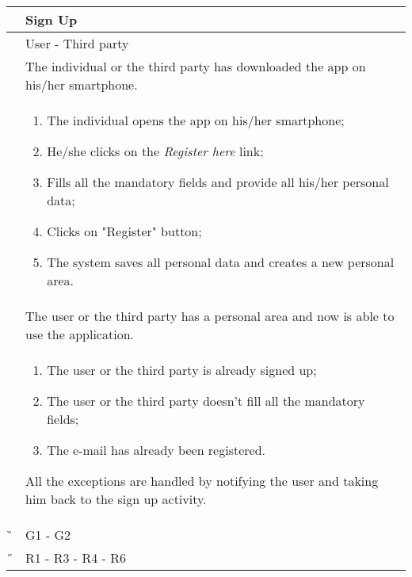 \begin{center}
	\begin{longtable}{ | p{} | p{} | }
		\hline 
		 \A &  Sign Up \\ 

		\hline
		 \B &  User - Third party \\ 

		\hline
  		 \C &  The individual or the third party has downloaded the app on his/her smartphone.\\ 

		\hline
		 \D & \begin{enumerate}
			\item The individual opens the app on his/her smartphone;
			\item He/she clicks on the \textit{Register here} link;
			\item Fills all the mandatory fields and provide all his/her personal data;
			\item Clicks on "Register" button;
			\item The system saves all personal data and creates a new personal area.
		\end{enumerate} \\

		\hline
		 \E &  The user or the third party has a personal area and now is able to use the application.\\

		\hline
		 \F & \begin{enumerate}
			\item The user or the third party is already signed up;
			\item The user or the third party doesn't fill all the mandatory fields;
			\item The e-mail has already been registered.
		\end{enumerate} All the exceptions are handled by notifying the user and taking him back to the sign up activity.\\
		
		\hline
		 \G &  G1 - G2\\

		\hline
		 \H &  R1 - R3 - R4 - R6 \\
		\hline

	\end{longtable}
\end{center}